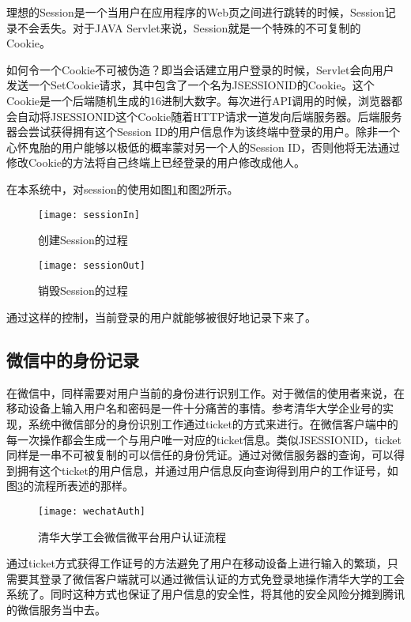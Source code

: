 理想的Session是一个当用户在应用程序的Web页之间进行跳转的时候，Session记录不会丢失。对于JAVA Servlet来说，Session就是一个特殊的不可复制的Cookie。

如何令一个Cookie不可被伪造？即当会话建立用户登录的时候，Servlet会向用户发送一个SetCookie请求，其中包含了一个名为JSESSIONID的Cookie。这个Cookie是一个后端随机生成的16进制大数字。每次进行API调用的时候，浏览器都会自动将JSESSIONID这个Cookie随着HTTP请求一道发向后端服务器。后端服务器会尝试获得拥有这个Session ID的用户信息作为该终端中登录的用户。除非一个心怀鬼胎的用户能够以极低的概率蒙对另一个人的Session ID，否则他将无法通过修改Cookie的方法将自己终端上已经登录的用户修改成他人。

在本系统中，对session的使用如图\ref{fig:sessionIn}和图\ref{fig:sessionOut}所示。

\begin{figure}[H]
  \centering
  \texttt{[image: sessionIn]}
  \caption{创建Session的过程}
  \label{fig:sessionIn}
\end{figure}

\begin{figure}[H]
  \centering
  \texttt{[image: sessionOut]}
  \caption{销毁Session的过程}
  \label{fig:sessionOut}
\end{figure}

通过这样的控制，当前登录的用户就能够被很好地记录下来了。

\subsection{微信中的身份记录}

在微信中，同样需要对用户当前的身份进行识别工作。对于微信的使用者来说，在移动设备上输入用户名和密码是一件十分痛苦的事情。参考清华大学企业号的实现，系统中微信部分的身份识别工作通过ticket的方式来进行。在微信客户端中的每一次操作都会生成一个与用户唯一对应的ticket信息。类似JSESSIONID，ticket同样是一串不可被复制的可以信任的身份凭证。通过对微信服务器的查询，可以得到拥有这个ticket的用户信息，并通过用户信息反向查询得到用户的工作证号，如图\ref{fig:wechatAuth}的流程所表述的那样。

\begin{figure}[H]
  \centering
  \texttt{[image: wechatAuth]}
  \caption{清华大学工会微信微平台用户认证流程}
  \label{fig:wechatAuth}
\end{figure}

通过ticket方式获得工作证号的方法避免了用户在移动设备上进行输入的繁琐，只需要其登录了微信客户端就可以通过微信认证的方式免登录地操作清华大学的工会系统了。同时这种方式也保证了用户信息的安全性，将其他的安全风险分摊到腾讯的微信服务当中去。

